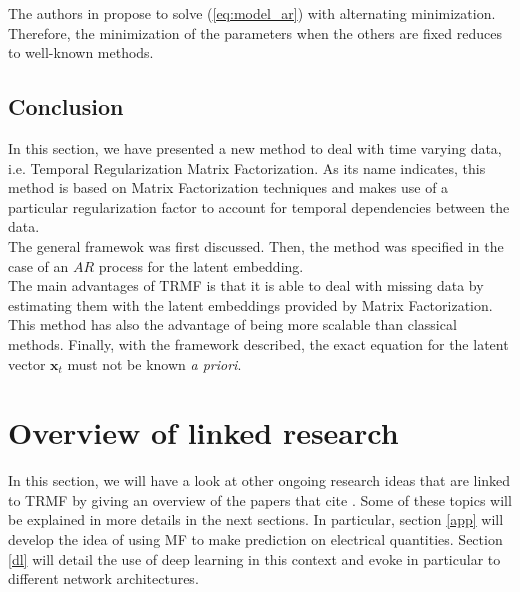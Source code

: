 \documentclass{article}
\begin{document}
The authors in \cite{TRMF} propose to solve (\ref{eq:model_ar}) with alternating minimization. Therefore, the minimization of the parameters when the others are fixed reduces to well-known methods.

\subsection*{Conclusion}
In this section, we have presented a new method to deal with time varying data, i.e. Temporal Regularization Matrix Factorization. As its name indicates, this method is based on Matrix Factorization techniques and makes use of a particular regularization factor to account for temporal dependencies between the data. \\
The general framewok was first discussed. Then, the method was specified in the case of an $AR$ process for the latent embedding. \\
The main advantages of TRMF is that it is able to deal with missing data by estimating them with the latent embeddings provided by Matrix Factorization. This method has also the advantage of being more scalable than classical methods. Finally, with the framework described, the exact equation for the latent vector $\mathbf{x}_t$ must not be known \emph{a priori}.

\section{Overview of linked research}
\label{over}
In this section, we will have a look at other ongoing research ideas that are linked to TRMF by giving an overview of the papers that cite \cite{TRMF}. Some of these topics will be explained in more details in the next sections. In particular, section \ref{app} will develop the idea of using MF to make prediction on electrical quantities. Section \ref{dl} will detail the use of deep learning in this context and evoke in particular to different network architectures. \\
\end{document}
